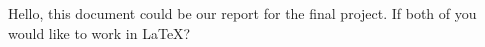\documentclass{article}
\begin{document}
Hello, this document could be our report for the final project. 
If both of you would like to work in LaTeX?
\end{document}
